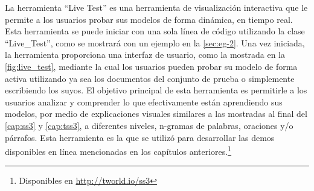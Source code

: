 La herramienta ``Live Test'' es una herramienta de visualización interactiva que le permite a los usuarios probar sus modelos de forma dinámica, en tiempo real.
Esta herramienta se puede iniciar con una sola línea de código utilizando la clase ``Live\_Test'', como se mostrará con un ejemplo en la \autoref{sec:eg-2}.
Una vez iniciada, la herramienta proporciona una interfaz de usuario, como la mostrada en la \autoref{fig:live_test}, mediante la cual los usuarios pueden probar su modelo de forma activa utilizando ya sea los documentos del conjunto de prueba o simplemente escribiendo los suyos.
El objetivo principal de esta herramienta es permitirle a los usuarios analizar y comprender lo que efectivamente están aprendiendo sus modelos, por medio de explicaciones visuales similares a las mostradas al final del \autoref{cap:ss3} y \autoref{cap:tss3}, a diferentes niveles, n-gramas de palabras, oraciones y/o párrafos.
Esta herramienta es la que se utilizó para desarrollar las demos disponibles en línea mencionadas en los capítulos anteriores.\footnote{Disponibles en  \url{http://tworld.io/ss3}}

